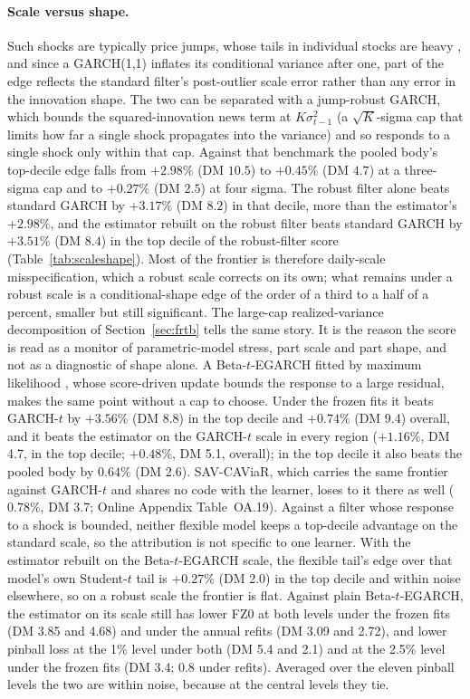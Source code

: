 \documentclass[11pt]{article}
\theoremstyle{remark}
\begin{document}
\paragraph{Scale versus shape.} Such shocks are typically price jumps, whose tails in individual stocks are heavy \citep{bollerslev2013jumptails}, and since a GARCH(1,1) inflates its conditional
variance after one, part of the edge reflects the standard
filter's post-outlier scale error rather than any error in the
innovation shape. The two can be separated with a jump-robust GARCH,
which bounds the squared-innovation news term at $K\sigma_{t-1}^2$ (a
$\sqrt{K}$-sigma cap that limits how far a single shock propagates into the
variance) and so responds to a single shock only within that cap. Against that benchmark the pooled body's top-decile
edge falls from $+2.98\%$ (DM $10.5$) to $+0.45\%$ (DM $4.7$) at a
three-sigma cap and to $+0.27\%$ (DM $2.5$) at four sigma. The robust
filter alone beats standard GARCH by $+3.17\%$ (DM $8.2$) in that decile,
more than the estimator's $+2.98\%$, and the estimator rebuilt on the
robust filter beats standard GARCH by $+3.51\%$ (DM $8.4$) in the top decile of the robust-filter score (Table~\ref{tab:scaleshape}). Most of the frontier is therefore
daily-scale misspecification, which a robust scale corrects on its own;
what remains under a robust scale is a conditional-shape edge of the order
of a third to a half of a percent, smaller but still significant. The
large-cap realized-variance decomposition of Section~\ref{sec:frtb}
tells the same story. It is the reason the score is read as a monitor of
parametric-model stress, part scale and part shape, and not as a
diagnostic of shape alone. A Beta-$t$-EGARCH fitted by maximum likelihood \citep{harvey2013dynamic}, whose score-driven update bounds the response to a large residual, makes the same point without a cap to choose. Under the frozen fits it beats GARCH-$t$ by $+3.56\%$ (DM 8.8) in the top decile and $+0.74\%$ (DM 9.4) overall, and it beats the estimator on the GARCH-$t$ scale in every region ($+1.16\%$, DM 4.7, in the top decile; $+0.48\%$, DM 5.1, overall); in the top decile it also beats the pooled body by $0.64\%$ (DM 2.6). SAV-CAViaR, which carries the same frontier against GARCH-$t$ and shares no code with the learner, loses to it there as well ($0.78\%$, DM 3.7; Online Appendix Table~OA.19). Against a filter whose response to a shock is bounded, neither flexible model keeps a top-decile advantage on the standard scale, so the attribution is not specific to one learner. With the estimator rebuilt on the Beta-$t$-EGARCH scale, the flexible tail's edge over that model's own Student-$t$ tail is $+0.27\%$ (DM 2.0) in the top decile and within noise elsewhere, so on a robust scale the frontier is flat. Against plain Beta-$t$-EGARCH, the estimator on its scale still has lower FZ0 at both levels under the frozen fits (DM 3.85 and 4.68) and under the annual refits (DM 3.09 and 2.72), and lower pinball loss at the 1\% level under both (DM 5.4 and 2.1) and at the 2.5\% level under the frozen fits (DM 3.4; 0.8 under refits). Averaged over the eleven pinball levels the two are within noise, because at the central levels they tie.
\end{document}
